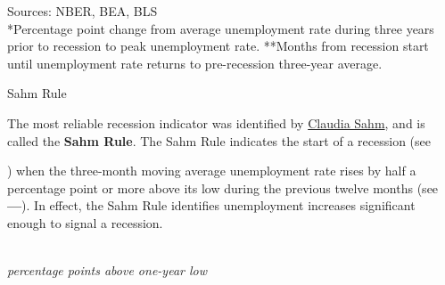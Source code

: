\begin{minipage}{0.76\textwidth}
\footnotesize{Sources: NBER, BEA, BLS}\\
\footnotesize{*Percentage point change from average unemployment rate during three years prior to recession to peak unemployment rate. **Months from recession start until unemployment rate returns to pre-recession three-year average.}
\vspace{5mm}

 \normalsize Sahm Rule

\small The most reliable recession indicator  was identified by \href{https://sites.google.com/site/claudiasahm/}{Claudia Sahm}, and is called the \textbf{Sahm Rule}. The Sahm Rule indicates the start of a recession (see ) when the three-month moving average unemployment rate rises by half a percentage point or more above its low during the previous twelve months (see {\color{steelblue}\textbf{---}}). In effect, the Sahm Rule identifies unemployment increases significant enough to signal a recession.  
\vspace{1mm}

\\
\footnotesize{\textit{percentage points above one-year low}}
\vspace{-8mm}


\end{minipage}
